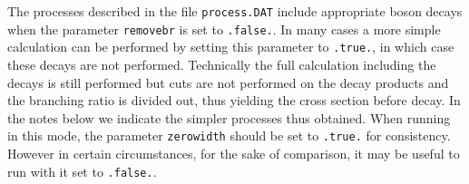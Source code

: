
\label{sec:specific}

The processes described in the file {\tt process.DAT} include
appropriate boson decays when the parameter {\tt removebr} is set to
{\tt .false.}. In many cases a more simple calculation can be
performed by setting this parameter to {\tt .true.}, in which case
these decays are not performed.  Technically the full calculation
including the decays is still performed but cuts are not performed on
the decay products and the branching ratio is divided out, thus
yielding the cross section before decay.  In the notes below we
indicate the simpler processes thus obtained. When running in this
mode, the parameter {\tt zerowidth} should be set to {\tt .true.} for
consistency. However in certain circumstances, for the sake of
comparison, it may be useful to run with it set to {\tt .false.}.

